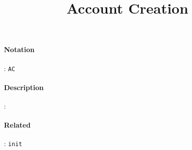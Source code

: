 \documentclass[10pt,a4paper,oneside]{scrartcl}
\title{Account Creation}
\date{}
\begin{document}
\maketitle
\paragraph{Notation}: \texttt{AC}
\paragraph{Description}: %
\paragraph{Related}: \texttt{init}
\par
\end{document}
